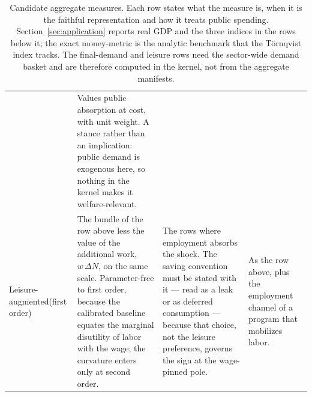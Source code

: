 \begin{table}[htbp]
\begin{tabular}{@{}>{\raggedright\arraybackslash}p{1.85cm}>{\raggedright\arraybackslash}p{3.9cm}>{\raggedright\arraybackslash}p{4.3cm}>{\raggedright\arraybackslash}p{4.3cm}@{}}
& Values public absorption at cost, with unit weight. A stance rather than an implication: public demand is exogenous here, so nothing in the kernel makes it welfare-relevant. \\
Leisure-augmented\newline \scriptsize (first order)
& The bundle of the row above less the value of the additional work, $w\,\Delta N$, on the same scale. Parameter-free to first order, because the calibrated baseline equates the marginal disutility of labor with the wage; the curvature enters only at second order.
& The rows where employment absorbs the shock. The saving convention must be stated with it --- read as a leak or as deferred consumption --- because that choice, not the leisure preference, governs the sign at the wage-pinned pole.
& As the row above, plus the employment channel of a program that mobilizes labor. \\
\bottomrule
\end{tabular}
\caption{Candidate aggregate measures. Each row states what the measure is,
when it is the faithful representation and how it treats public spending.
Section~\ref{sec:application} reports real GDP and the three indices in the
rows below it; the exact money-metric is the analytic benchmark that the
T\"ornqvist index tracks. The final-demand and leisure rows need the
sector-wide demand basket and are therefore computed in the kernel, not from
the aggregate manifests.}
\label{tab:welfare-measures}
\end{table}
